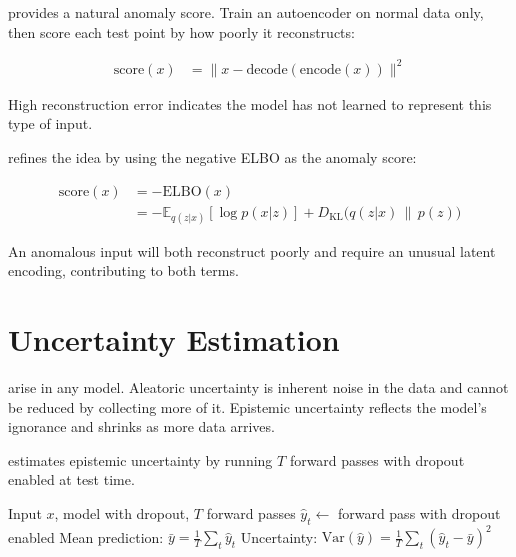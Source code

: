 
 provides a natural anomaly score.
Train an autoencoder on normal data only, then score each test point by how poorly it reconstructs:

\begin{align*}
    \text{score}(x) &= \|x - \text{decode}(\text{encode}(x))\|^2
\end{align*}

High reconstruction error indicates the model has not learned to represent this type of input.

 refines the idea by using the negative ELBO as the anomaly score:

\begin{align*}
    \text{score}(x) &= -\text{ELBO}(x) \\
                     &= -\mathbb{E}_{q(z|x)}[\log p(x|z)] + D_{\text{KL}}\!\bigl(q(z|x) \,\|\, p(z)\bigr)
\end{align*}

An anomalous input will both reconstruct poorly and require an unusual latent encoding, contributing to both terms.


\section{Uncertainty Estimation}


 arise in any model.
Aleatoric uncertainty is inherent noise in the data and cannot be reduced by collecting more of it.
Epistemic uncertainty reflects the model's ignorance and shrinks as more data arrives.

 estimates epistemic uncertainty by running $T$ forward passes with dropout enabled at test time.

\begin{algorithm}[H]
\caption{MC Dropout for Uncertainty}
\begin{algorithmic}[1]
\Require Input $x$, model with dropout, $T$ forward passes
    \State $\hat{y}_t \gets$ forward pass with dropout enabled
\EndFor
\State Mean prediction: $\bar{y} = \tfrac{1}{T} \sum_t \hat{y}_t$
\State Uncertainty: $\text{Var}(\hat{y}) = \tfrac{1}{T} \sum_t (\hat{y}_t - \bar{y})^2$
\end{algorithmic}
\end{algorithm}

